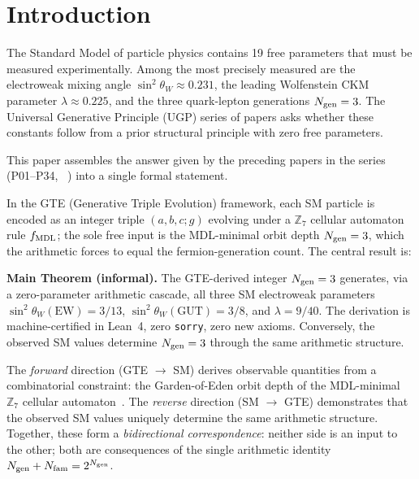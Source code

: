 \documentclass[11pt]{article}
\theoremstyle{remark}
\newcommand{\ZS}{\mathbb{Z}_7}
\newcommand{\Ngen}{N_{\rm gen}}
\newcommand{\Nfam}{N_{\rm fam}}
\newcommand{\sinwsq}{\sin^2\!\theta_W}
\newcommand{\lam}{\lambda}
\begin{document}
\section{Introduction}
\label{sec:intro}

The Standard Model of particle physics contains 19 free parameters that must be
measured experimentally. Among the most precisely measured are the electroweak
mixing angle $\sinwsq \approx 0.231$, the leading Wolfenstein CKM parameter
$\lam \approx 0.225$, and the three quark-lepton generations $\Ngen = 3$.
The Universal Generative Principle (UGP) series of papers asks whether these
constants follow from a prior structural principle with zero free parameters.

This paper assembles the answer given by the preceding papers in the series
(P01--P34, ~\cite{Spivack2026_SM_UGP,SpivackCompUniversality,SpivackWeinbergAngle,%
SpivackCKM,SpivackDeeperConsequences,SpivackGTEMobius}) into a single formal
statement.

In the GTE (Generative Triple Evolution) framework, each SM particle is encoded as an integer triple $(a,b,c;g)$ evolving under a $\mathbb{Z}_7$ cellular automaton rule $f_{\rm MDL}$; the sole free input is the MDL-minimal orbit depth $\Ngen = 3$, which the arithmetic forces to equal the fermion-generation count. The central result is:

\begin{tcolorbox}[colback=blue!4,colframe=blue!40!black,
  fonttitle=\bfseries,left=6pt,right=6pt,top=5pt,bottom=5pt]
\textbf{Main Theorem (informal).}
The GTE-derived integer $\Ngen = 3$ generates, via a zero-parameter arithmetic
cascade, all three SM electroweak parameters $\sinwsq(\text{EW}) = 3/13$,
$\sinwsq(\text{GUT}) = 3/8$, and $\lam = 9/40$. The derivation is machine-certified
in Lean~4, zero \texttt{sorry}, zero new axioms. Conversely, the observed SM values
determine $\Ngen = 3$ through the same arithmetic structure.
\end{tcolorbox}

\noindent
The \emph{forward} direction (GTE $\to$ SM) derives observable quantities
from a combinatorial constraint: the Garden-of-Eden orbit depth of the MDL-minimal
$\ZS$ cellular automaton~\cite{SpivackCompUniversality}.
The \emph{reverse} direction (SM $\to$ GTE) demonstrates that the observed
SM values uniquely determine the same arithmetic structure.
Together, these form a \emph{bidirectional correspondence}: neither side is
an input to the other; both are consequences of the single arithmetic identity
$\Ngen + \Nfam = 2^{\Ngen}$.
\end{document}
